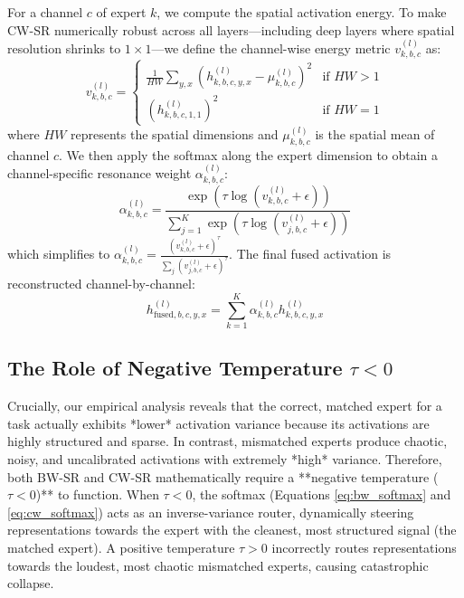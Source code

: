 \documentclass{article}
\theoremstyle{plain}
\theoremstyle{definition}
\theoremstyle{remark}
\begin{document}
For a channel $c$ of expert $k$, we compute the spatial activation energy. To make CW-SR numerically robust across all layers—including deep layers where spatial resolution shrinks to $1 \times 1$—we define the channel-wise energy metric $v_{k, b, c}^{(l)}$ as:
\begin{equation}
    v_{k, b, c}^{(l)} = \begin{cases}
        \frac{1}{HW} \sum_{y, x} \left( h_{k, b, c, y, x}^{(l)} - \mu_{k, b, c}^{(l)} \right)^2 & \text{if } HW > 1 \\
        \left( h_{k, b, c, 1, 1}^{(l)} \right)^2 & \text{if } HW = 1
    \end{cases}
\label{eq:cw_var}
\end{equation}
where $HW$ represents the spatial dimensions and $\mu_{k, b, c}^{(l)}$ is the spatial mean of channel $c$. We then apply the softmax along the expert dimension to obtain a channel-specific resonance weight $\alpha_{k, b, c}^{(l)}$:
\begin{equation}
    \alpha_{k, b, c}^{(l)} = \frac{\exp\left(\tau \log\left(v_{k, b, c}^{(l)} + \epsilon\right)\right)}{\sum_{j=1}^K \exp\left(\tau \log\left(v_{j, b, c}^{(l)} + \epsilon\right)\right)}
\label{eq:cw_softmax}
\end{equation}
which simplifies to $\alpha_{k, b, c}^{(l)} = \frac{(v_{k, b, c}^{(l)} + \epsilon)^\tau}{\sum_j (v_{j, b, c}^{(l)} + \epsilon)^\tau}$. The final fused activation is reconstructed channel-by-channel:
\begin{equation}
    h_{\text{fused}, b, c, y, x}^{(l)} = \sum_{k=1}^K \alpha_{k, b, c}^{(l)} h_{k, b, c, y, x}^{(l)}
\label{eq:cw_fuse}
\end{equation}

\subsection{The Role of Negative Temperature $\tau < 0$}
Crucially, our empirical analysis reveals that the correct, matched expert for a task actually exhibits *lower* activation variance because its activations are highly structured and sparse. In contrast, mismatched experts produce chaotic, noisy, and uncalibrated activations with extremely *high* variance. 
Therefore, both BW-SR and CW-SR mathematically require a **negative temperature ($\tau < 0$)** to function. When $\tau < 0$, the softmax (Equations \ref{eq:bw_softmax} and \ref{eq:cw_softmax}) acts as an inverse-variance router, dynamically steering representations towards the expert with the cleanest, most structured signal (the matched expert). A positive temperature $\tau > 0$ incorrectly routes representations towards the loudest, most chaotic mismatched experts, causing catastrophic collapse.
\end{document}

